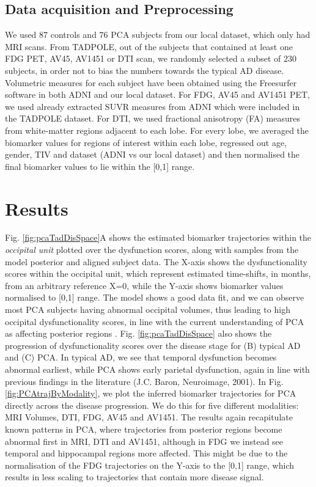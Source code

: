 \documentclass{llncs}
\begin{document}
\subsection{Data acquisition and Preprocessing}

We used 87 controls and 76 PCA subjects from our local dataset, which only had MRI scans. From TADPOLE, out of the subjects that contained at least one FDG PET, AV45, AV1451 or DTI scan, we randomly selected a subset of 230 subjects, in order not to bias the numbers towards the typical AD disease.  Volumetric measures for each subject have been obtained using the Freesurfer software in both ADNI and our local dataset. For FDG, AV45 and AV1451 PET, we used already extracted SUVR measures from ADNI which were included in the TADPOLE dataset. For DTI, we used fractional anisotropy (FA) measures from white-matter regions adjacent to each lobe. For every lobe, we averaged the biomarker values for regions of interest within each lobe, regressed out age, gender, TIV and dataset (ADNI vs our local dataset) and then normalised the final biomarker values to lie within the [0,1] range.

\section{Results}

Fig. \ref{fig:pcaTadDisSpace}A shows the estimated biomarker trajectories within the \emph{occipital unit} plotted over the dysfunction scores, along with samples from the model posterior and aligned subject data. The X-axis shows the dysfunctionality scores within the occipital unit, which represent estimated time-shifts, in months, from an arbitrary reference X=0, while the Y-axis shows biomarker values normalised to [0,1] range. The model shows a good data fit, and we can observe most PCA subjects having abnormal occipital volumes, thus leading to high occipital dysfunctionality scores, in line with the current understanding of PCA as affecting posterior regions \cite{crutch2012posterior}. Fig. \ref{fig:pcaTadDisSpace} also shows the progression of dysfunctionality scores over the disease stage for (B) typical AD and (C) PCA. In typical AD, we see that temporal dysfunction becomes abnormal earliest, while PCA shows early parietal dysfunction, again in line with previous findings in the literature \cite{crutch2012posterior} (J.C. Baron, Neuroimage, 2001). In Fig. \ref{fig:PCAtrajByModality}, we plot the inferred biomarker trajectories for PCA directly across the disease progression. We do this for five different modalities: MRI Volumes, DTI, FDG, AV45 and AV1451. The results again recapitulate known patterns in PCA, where trajectories from posterior regions become abnormal first in MRI, DTI and AV1451, although in FDG we instead see temporal and hippocampal regions more affected. This might be due to the normalisation of the FDG trajectories on the Y-axis to the [0,1] range, which results in less scaling to trajectories that contain more disease signal. 
\end{document}
